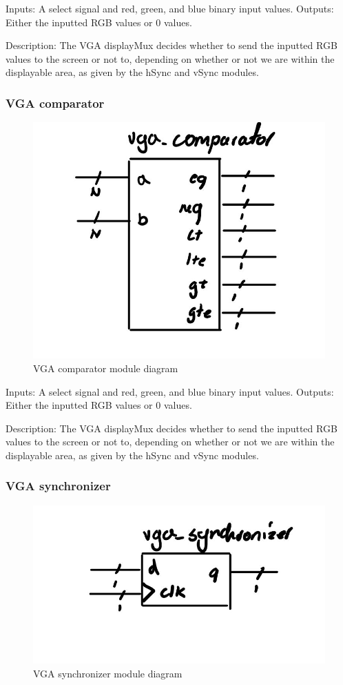 \documentclass[a4paper]{article}
\begin{document}
Inputs: A select signal and red, green, and blue binary input values.
Outputs: Either the inputted RGB values or 0 values.

Description: The VGA displayMux decides whether to send the inputted RGB values to the screen or not to, depending on whether or not we are within the displayable area, as given by the hSync and vSync modules.

\subsubsection{VGA comparator}

\begin{figure}[H]
    \includegraphics[width=0.8 \linewidth]{images/vgacomparator.JPG}
    \caption{VGA comparator module diagram}
    \label{vgaComparatorDiagram}
\end{figure}

Inputs: A select signal and red, green, and blue binary input values.
Outputs: Either the inputted RGB values or 0 values.

Description: The VGA displayMux decides whether to send the inputted RGB values to the screen or not to, depending on whether or not we are within the displayable area, as given by the hSync and vSync modules.

\subsubsection{VGA synchronizer}

\begin{figure}[H]
    \includegraphics[width=0.8 \linewidth]{images/vgasynchronizer.JPG}
    \caption{VGA synchronizer module diagram}
    \label{vgaSynchronizerDiagram}
\end{figure}
\end{document}
